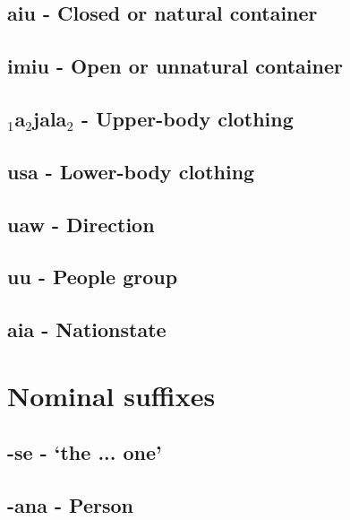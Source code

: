 \subsection{a\rootpart{}i\rootpart{}u - Closed or natural container}

\subsection{\rootpart{}imi\rootpart{}u - Open or unnatural container}

\subsection{{\rootpart$_1$}a{\rootpart$_2$}jala{\rootpart$_2$} - Upper-body clothing}

\subsection{us\rootpart{}a\rootpart{} - Lower-body clothing}

\subsection{\rootpart{}u\rootpart{}aw - Direction}

\subsection{\rootpart{}uu\rootpart{} - People group}

\subsection{\rootpart{}a\rootpart{}ia - Nationstate}

\section{Nominal suffixes}


\subsection{-se - `the ... one'}

\subsection{-ana - Person}

